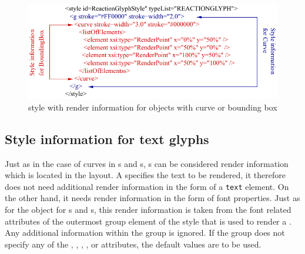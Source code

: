 \begin{figure}[!ht]
\begin{center}
\includegraphics{figures/CurveAndBBStyle.pdf}
\end{center}
\caption{style with render information for objects with curve or bounding box}
\label{CurveAndBBStyle}
\end{figure}

\subsection{Style information for text glyphs}
Just as in the case of curves in {}s and {}s,
{}s can be considered render information which is located
in the layout. A  specifies the text to be rendered,
it therefore does not need additional render information in the form of
a \texttt{text} element. On the other hand, it needs render information in the form of font properties.
Just as for the \RenderCurve
object for {}s and {}s, this render information is
taken from the font related attributes of the outermost group element of the
style that is used to render a . Any additional information within the
group is ignored. If the group does not specify any of the ,
, , , 
 or  attributes, the default values are to be used.
